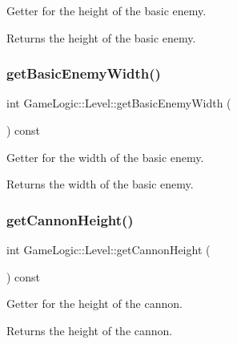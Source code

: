 Getter for the height of the basic enemy. \begin{DoxyReturn}{Returns}
the height of the basic enemy. 
\end{DoxyReturn}
\mbox{\label{classGameLogic_1_1Level_a393075a2f768bf13c35ca338d1785694}} 
\subsubsection{\texorpdfstring{get\+Basic\+Enemy\+Width()}{getBasicEnemyWidth()}}
{\footnotesize\ttfamily int Game\+Logic\+::\+Level\+::get\+Basic\+Enemy\+Width (\begin{DoxyParamCaption}{ }\end{DoxyParamCaption}) const}

Getter for the width of the basic enemy. \begin{DoxyReturn}{Returns}
the width of the basic enemy. 
\end{DoxyReturn}
\mbox{\label{classGameLogic_1_1Level_ae66002e5cfd3f4404d34e1221505aeef}} 
\subsubsection{\texorpdfstring{get\+Cannon\+Height()}{getCannonHeight()}}
{\footnotesize\ttfamily int Game\+Logic\+::\+Level\+::get\+Cannon\+Height (\begin{DoxyParamCaption}{ }\end{DoxyParamCaption}) const}

Getter for the height of the cannon. \begin{DoxyReturn}{Returns}
the height of the cannon. 
\end{DoxyReturn}
\mbox{\label{classGameLogic_1_1Level_a423e12a9f87441175f1ae449096ee997}} 
